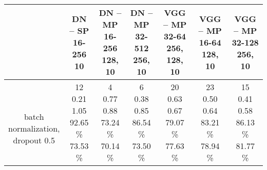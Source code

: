 \begin{center}
\begin{tabular}{ |c|c|c|c|c|c|c| }
\hline
& \thead{DN -- SP\\16-256\\10} & \thead{DN -- MP\\16-256\\128, 10} & \thead{DN -- MP\\32-512\\256, 10} & \thead{VGG -- MP\\32-64\\256, 128, 10} & \thead{VGG -- MP\\16-64\\128, 10} & \thead{VGG -- MP\\32-128\\256, 10} \\
\hline
\thead{\\batch\\normalization,\\dropout 0.5} & \makecell{
12 \\
0.21 \\
1.05 \\
92.65 \% \\
73.53 \% \\
} & \makecell{
4 \\
0.77 \\
0.88 \\
73.24 \% \\
70.14 \% \\
} & \makecell{
6 \\
0.38 \\
0.85 \\
86.54 \% \\
73.50 \% \\
} & \makecell{
20 \\
0.63 \\
0.67 \\
79.07 \% \\
77.63 \% \\
} & \makecell{
23 \\
0.50 \\
0.64 \\
83.21 \% \\
78.94 \% \\
} & \makecell{
15 \\
0.41 \\
0.58 \\
86.13 \% \\
81.77 \% \\
}
\end{tabular}
\end{center}
